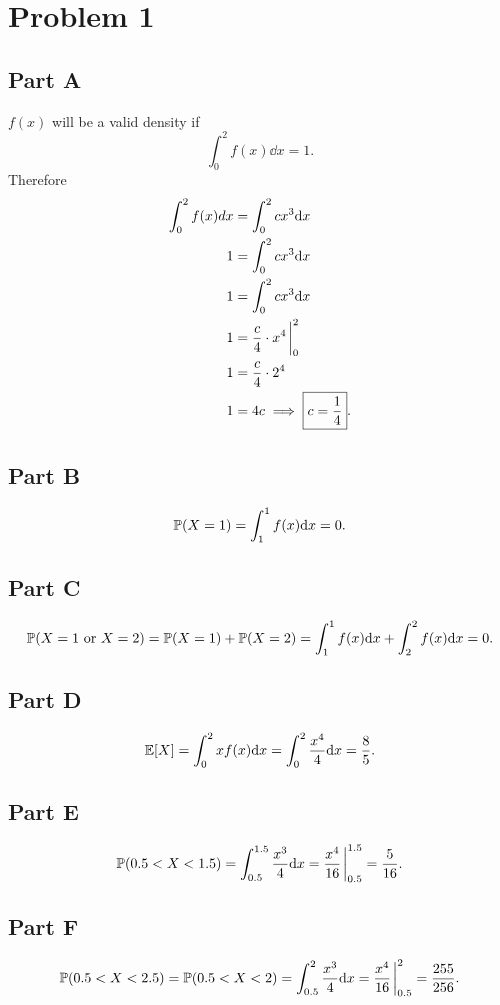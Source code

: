 \documentclass[12pt]{extarticle}
\begin{document}
\section*{Problem 1}
\subsection*{Part A}
$f(x)$ will be a valid density if
\[
	\int_0^2 f(x) \dd x = 1
.\]
Therefore
\begin{align*}
	\int_0^2 f(x) dx &= \int_0^2 cx^3 \dd x \\
	1 &= \int_0^2 cx^3 \dd x \\
	1 &= \int_0^2 cx^3 \dd x \\
	1 &= \frac{c}{4}\cdot x^4 \eval_0^2 \\
	1 &= \frac{c}{4}\cdot 2^4 \\
	1 &= 4c \implies \boxed{c = \frac{1}{4}}
.\end{align*}

\subsection*{Part B}
\[
	\mathbb{P}\qty(X = 1) = \int_1^1 f(x) \dd x = 0
.\]

\subsection*{Part C}
\[
	\mathbb{P}\qty(X = 1 \text{ or } X = 2) = \mathbb{P}\qty(X = 1) + \mathbb{P}\qty(X = 2) = \int_1^1 f(x) \dd x + \int_2^2 f(x) \dd x = 0
.\]

\subsection*{Part D}
\[
	\mathbb{E}\qty[X] = \int_0^2 x f(x) \dd x = \int_0^2 \frac{x^4}{4} \dd x = \frac{8}{5}
.\]

\subsection*{Part E}
\[
	\Prob{0.5 < X < 1.5} = \int_{0.5}^{1.5} \frac{x^3}{4} \dd x = \frac{x^4}{16} \eval_{0.5}^{1.5} = \frac{5}{16}
.\]

\subsection*{Part F}
\[
	\Prob{0.5 < X < 2.5} = \Prob{0.5 < X < 2} = \int_{0.5}^{2} \frac{x^3}{4} \dd x = \frac{x^4}{16} \eval_{0.5}^{2} = \frac{255}{256}
.\]
\end{document}

